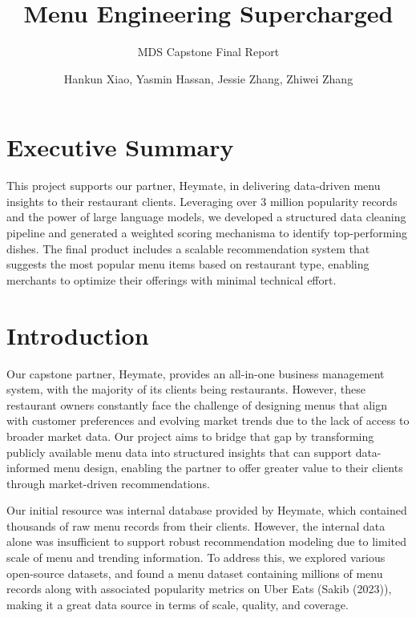 \documentclass[
  11pt,
  a4paper,
  DIV=11,
  numbers=noendperiod]{scrartcl}
\title{Menu Engineering Supercharged}
\subtitle{MDS Capstone Final Report}
\author{Hankun Xiao, Yasmin Hassan, Jessie Zhang, Zhiwei Zhang}
\date{}
\renewcommand*\contentsname{Table of contents}
\newcommand\contentsname{Table of contents}
\begin{document}
\maketitle

\renewcommand*\contentsname{Table of contents}
{
\hypersetup{linkcolor=}
\setcounter{tocdepth}{2}
\tableofcontents
}

\section{Executive Summary}\label{executive-summary}

This project supports our partner, Heymate, in delivering data-driven
menu insights to their restaurant clients. Leveraging over 3 million
popularity records and the power of large language models, we developed
a structured data cleaning pipeline and generated a weighted scoring
mechanisma to identify top-performing dishes. The final product includes
a scalable recommendation system that suggests the most popular menu
items based on restaurant type, enabling merchants to optimize their
offerings with minimal technical effort.

\section{Introduction}\label{introduction}

Our capstone partner, Heymate, provides an all-in-one business
management system, with the majority of its clients being restaurants.
However, these restaurant owners constantly face the challenge of
designing menus that align with customer preferences and evolving market
trends due to the lack of access to broader market data. Our project
aims to bridge that gap by transforming publicly available menu data
into structured insights that can support data-informed menu design,
enabling the partner to offer greater value to their clients through
market-driven recommendations.

Our initial resource was internal database provided by Heymate, which
contained thousands of raw menu records from their clients. However, the
internal data alone was insufficient to support robust recommendation
modeling due to limited scale of menu and trending information. To
address this, we explored various open-source datasets, and found a menu
dataset containing millions of menu records along with associated
popularity metrics on Uber Eats (Sakib (2023)), making it a great data
source in terms of scale, quality, and coverage.
\end{document}
